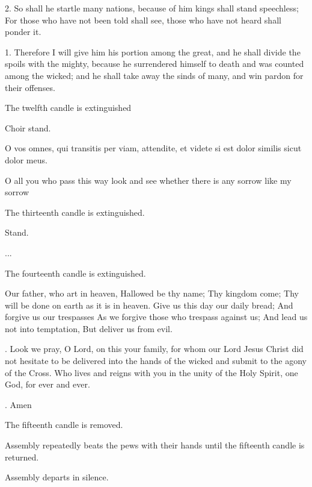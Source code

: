 2. So shall he startle many nations, because of him kings shall stand
speechless; For those who have not been told shall see, those who have not
heard shall ponder it.

1. Therefore I will give him his portion among the great, and he shall divide
the spoils with the mighty, because he surrendered himself to death and was
counted among the wicked; and he shall take away the sinds of many, and win
pardon for their offenses.



\begin{rubric}
  The twelfth candle is extinguished
\end{rubric}


\begin{rubric}
  Choir stand.
\end{rubric}

O vos omnes,
qui transitis per viam,
attendite, et videte
si est dolor similis
sicut dolor meus.

O all you
who pass this way
look and see whether
there is any sorrow
like my sorrow

\begin{rubric}
  The thirteenth candle is extinguished.
\end{rubric}


\begin{rubric}
  Stand.
\end{rubric}

...

\begin{rubric}
  The fourteenth candle is extinguished.
\end{rubric}


Our father, who art in heaven,
Hallowed be thy name;
Thy kingdom come;
Thy will be done on earth as it is in heaven.
Give us this day our daily bread;
And forgive us our trespasses
As we forgive those who trespass against us;
And lead us not into temptation,
But deliver us from evil.


\begin{versicle}
  \VBar. Look we pray, O Lord, on this your family, for whom our Lord Jesus
  Christ did not hesitate to be delivered into the hands of the wicked and
  submit to the agony of the Cross. Who lives and reigns with you in the unity
  of the Holy Spirit, one God, for ever and ever.
\end{versicle}

\begin{response}
  \RBar. Amen
\end{response}

\begin{rubric}
  The fifteenth candle is removed.
\end{rubric}


\begin{rubric}
  Assembly repeatedly beats the pews with their hands until the fifteenth candle is returned.

  Assembly departs in silence.
\end{rubric}
